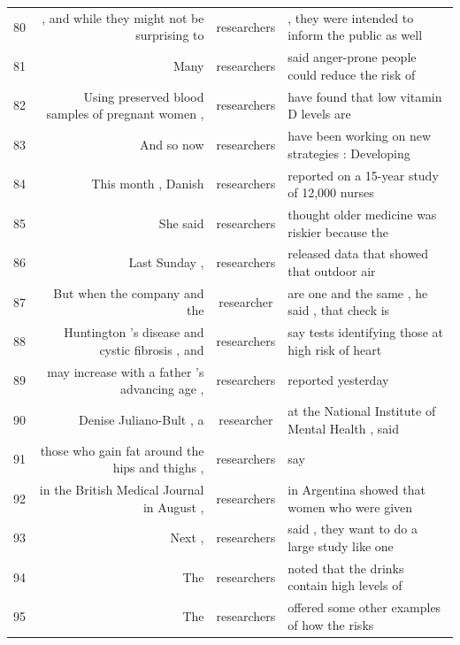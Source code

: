 {\begin{table}
\begin{tabular}{|lrcl|}
80 &  , and while they might not be surprising to        & researchers & , they were intended to inform the public as well  \\
81 &  Many                                               & researchers & said anger-prone people could reduce the risk of   \\
82 &  Using preserved blood samples of pregnant women ,  & researchers & have found that low vitamin D levels are           \\
83 &  And so now                                         & researchers & have been working on new strategies : Developing   \\
84 &  This month , Danish                                & researchers & reported on a 15-year study of 12,000 nurses       \\
85 &  She said                                           & researchers & thought older medicine was riskier because the     \\
86 &  Last Sunday ,                                      & researchers & released data that showed that outdoor air         \\
87 &  But when the company and the                       & researcher  & are one and the same , he said , that check is     \\
88 &  Huntington 's disease and cystic fibrosis , and    & researchers & say tests identifying those at high risk of heart  \\
89 &  may increase with a father 's advancing age ,      & researchers & reported yesterday                                 \\
90 &  Denise Juliano-Bult , a                            & researcher  & at the National Institute of Mental Health , said  \\
91 &  those who gain fat around the hips and thighs ,    & researchers & say                                                \\
92 &  in the British Medical Journal in August ,         & researchers & in Argentina showed that women who were given      \\
93 &  Next ,                                             & researchers & said , they want to do a large study like one      \\
94 &  The                                                & researchers & noted that the drinks contain high levels of       \\
95 &  The                                                & researchers & offered some other examples of how the risks       \\

\end{tabular}
\end{table}}
